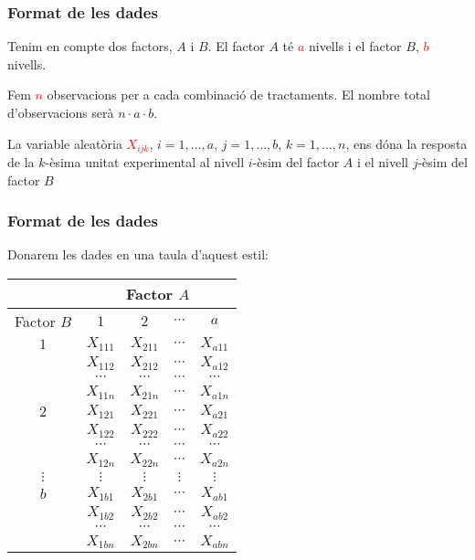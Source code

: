 \documentclass[12pt,t]{beamer}
\newcommand{\red}[1]{\textcolor{red}{#1}}
\theoremstyle{plain}
\theoremstyle{definition}
\begin{document}
\begin{frame}
\frametitle{Format de les dades}

Tenim en compte dos factors, $A$ i $B$.  El factor $A$ té \red{$a$} nivells i el factor $B$, \red{$b$}
nivells.
\medskip

Fem \red{$n$} observacions  per a cada combinació de
tractaments. El nombre total d'observacions serà $n\cdot
a\cdot b$.
\medskip

La variable aleatòria \red{$X_{ijk}$}, $i=1,\ldots,a$, $j=1,\ldots,b$, $k=1,\ldots,n$,
ens dóna la resposta de la $k$-èsima unitat
experimental al nivell $i$-èsim del factor $A$ i el nivell $j$-èsim del
factor $B$

\end{frame}
\begin{frame}
\frametitle{Format de les dades}
Donarem les dades en una taula d'aquest estil:
{\small\begin{center}
\begin{tabular}{ccccc}
\hline
&\multicolumn{4}{c}{Factor $A$}\\\hline
Factor $B$&$1$&$2$&$\cdots$&$a$\\\hline
$1$&$X_{111}$&$X_{211}$&$\cdots$&$X_{a11}$\\
&$X_{112}$&$X_{212}$&$\cdots$&$X_{a12}$\\
&$\cdots$&$\cdots$&$\cdots$&$\cdots$\\
&$X_{11n}$&$X_{21n}$&$\cdots$&$X_{a1n}$\\\hline
$2$&$X_{121}$&$X_{221}$&$\cdots$&$X_{a21}$\\
&$X_{122}$&$X_{222}$&$\cdots$&$X_{a22}$\\
&$\cdots$&$\cdots$&$\cdots$&$\cdots$\\
&$X_{12n}$&$X_{22n}$&$\cdots$&$X_{a2n}$\\\hline
$\vdots$&$\vdots$&$\vdots$&$\vdots$&$\vdots$\\\hline
$b$&$X_{1b1}$&$X_{2b1}$&$\cdots$&$X_{ab1}$\\
&$X_{1b2}$&$X_{2b2}$&$\cdots$&$X_{ab2}$\\
&$\cdots$&$\cdots$&$\cdots$&$\cdots$\\
&$X_{1bn}$&$X_{2bn}$&$\cdots$&$X_{abn}$\\\hline
\end{tabular}
\end{center}}
\end{frame}
\end{document}
